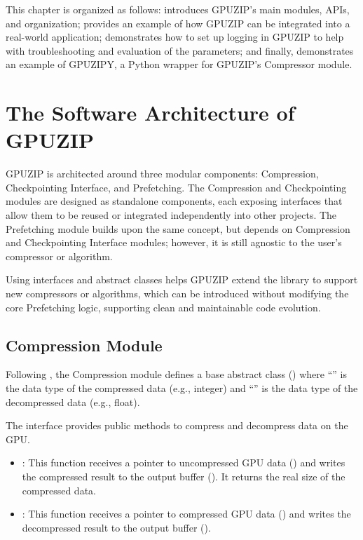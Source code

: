 \documentclass[Ingles]{ic-tese-v3}
\begin{document}
This chapter is organized as follows:  introduces GPUZIP's main modules, APIs, and organization;  provides an example of how GPUZIP can be integrated into a real-world application;  demonstrates how to set up logging in GPUZIP to help with troubleshooting and evaluation of the parameters; and finally,  demonstrates an example of GPUZIPY, a Python wrapper for GPUZIP's Compressor module.

\section{The Software Architecture of GPUZIP}
\label{sec:ossmodules}
GPUZIP is architected around three modular components: Compression, Checkpointing Interface, and Prefetching. The Compression and Checkpointing modules are designed as standalone components, each exposing interfaces that allow them to be reused or integrated independently into other projects. The Prefetching module builds upon the same concept, but depends on Compression and Checkpointing Interface modules; however, it is still agnostic to the user's compressor or \checkpointing algorithm.

Using interfaces and abstract classes helps GPUZIP extend the library to support new compressors or \checkpointing algorithms, which can be introduced without modifying the core Prefetching logic, supporting clean and maintainable code evolution.

\subsection{Compression Module}

Following , the Compression module defines a base abstract class () where ``'' is the data type of the compressed data (e.g., integer) and ``'' is the data type of the decompressed data (e.g., float). 

The  interface provides public methods to compress and decompress data on the GPU.

\begin{itemize}
    \item \textbf{}: This function receives a pointer to uncompressed GPU data () and writes the compressed result to the output buffer (). It returns the real size of the compressed data.
    \item \textbf{}: This function receives a pointer to compressed GPU data () and writes the decompressed result to the output buffer ().
\end{itemize}
\end{document}
